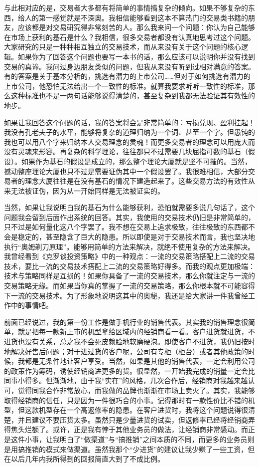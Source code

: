与此相对应的是，交易者大多都有将简单的事情搞复杂的倾向。如果不够复杂的东西，给人的第一感觉就是不深奥。我相信能够看到这本不算热门的交易类书籍的朋友，应该都是对交易研究得非常刻苦的人。那么我来问一个问题：你认为自己能够在市场上获利的基石是什么？我相信，很多交易者都没有认真地思考过这个问题。大家研究的只是一种种相互独立的交易技术，而从来没有关于这个问题的核心逻辑。如果你为了回答这个问题也要写一本书的话，那么应该可以说明你并没有找到交易的真谛。我问过身边朋友类似的问题，但我从来没有听到过相对满意的答案。有的答案是关于基本分析的，挑选有潜力的上市公司……但对于如何挑选有潜力的上市公司，他恐怕无法给出一个一致性的标准。就算我要求听听一致性的标准，那么这种标准也不是一两句话能够说得清楚的，甚至复杂到我都无法验证其有效性的地步。

如果让我回答这个问题的话，我的答案将会是非常简单的：亏损兑现、盈利挂起！我没有孔老夫子的水平，能够将复杂的道理归纳为一个词、甚至一个字。但愚钝的我也可以用八个字来归纳本人交易理念的灵魂！而更多交易者的理念可以用庞大而没有灵魂来形容。再复杂的科学理论，往往都只不过需要几块屈指可数的基石（假设）。如果作为基石的假设是成立的，那么整个理论大厦就是坚不可摧的。当然，撼动整座理论大厦也只不过是需要证伪其中一个假设罢了。我很难相信，大部分交易者的理念大厦往往是在没有基石的情况下建造起来了。这些交易方法的有效性从来无法被证伪，因为从一开始同样是无法被证实的。

当然，如果让我说明白我的基石为什么能够获利，恐怕就需要多说几句话了，这个问题我会留到后面作出系统的回答。其实，我使用的交易技术仍旧是非常简单的，只不过是如何量化这八个字罢了。我不想在交易上追求极致，往往极致的东西都不会是稳定的，甚至隐含了巨大的隐患。所以即使是对于交易技术而言，我也坚决地执行“奥姆剃刀原理”。能够用简单的方法来解决，就绝不使用复杂的方法来解决。我曾经看到《克罗谈投资策略》中的一种观点：一流的交易策略搭配上二流的交易技术，要比一流的交易技术搭配上二流的交易策略好得多。而我的观点更加极端：技术与策略同样是互损的！如果你具备了一流的交易技术，那么你就注定与一流的交易策略无缘。而如果当你真的掌握了一流的交易策略，那么你根本就不可能容得下一流的交易技术。为了形象地说明这其中的奥秘，我还是给大家讲一件我曾经工作中的事情吧。

前面已经说过，我的第一份工作是做手机行业的销售代表。其实我的销售理念很简单，就是把每一款新上市的机型拿给区域内的经销商看一看。客户进货就进货，不进货也没有关系，总之我不会死皮赖脸地软磨硬泡。即使客户不进货，我仍旧按时地解决好售后问题；对于进过货的客户呢，公司有专柜（柜台）或者其他政策的时候，我都是无条件地让客户享受。当然，如果是其他的销售代表，一定会利用公司的政策作为筹码，诱使经销商进更多的货。很显然，一开始我完成的销量一定会比同事小得多。但渐渐地，由于我“实在”的风格，几次合作后，经销商对我越来越认可，觉得同我合作非常放心，而我做的品牌也渐渐在市场上卖火了。其实，我能够取得经销商的信任，只是因为一件很巧合的小事。记得那时有一款性价比不错的机型，但这款机型存在一个高返修率的隐患。在客户进货时，我将这个问题说得很清楚，并且建议不要压货太多。虽然只是少量进货的试卖，但返修率已经将经销商弄得焦头烂额了。或许，正是我有悖于其他业务员的做法，让经销商非常感动。而正是这件小事，让我明白了“做渠道”与“搞推销”之间本质的不同，而更多的业务员则是用搞推销的模式来做渠道。虽然我那个“少进货”的建议让我少赚了一些工资，但在以后几年内我所得到的回报简直大到了不成比例。

